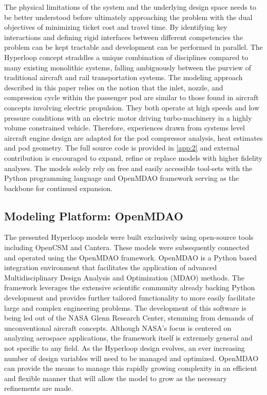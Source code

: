 \documentclass[heading.tex]{subfiles}
\begin{document}
The physical limitations of the system and the underlying design space needs to be better understood before ultimately approaching the
problem with the dual objectives of minimizing ticket cost and travel time. By identifying key interactions and defining rigid interfaces between
different competencies the problem can
be kept tractable and development can be performed in parallel. The Hyperloop concept straddles a unique combination of disciplines
compared to many existing monolithic systems, falling ambiguously between the purview of
traditional aircraft and rail transportation systems. The modeling
approach described in this paper relies on the notion that the inlet, nozzle, and compression cycle within the passenger pod are similar to those
found in aircraft concepts involving electric propulsion. They both operate at high speeds and low pressure conditions with an electric motor
driving turbo-machinery in a highly volume constrained vehicle. Therefore, experiences drawn from systems level aircraft engine
design are adapted for the pod compressor analysis, heat estimates and pod geometry. The full source code is provided in
 \cref{app:2} and external contribution is encouraged to expand, refine or replace models with higher fidelity analyses. The models solely rely on
free and easily accessible tool-sets with the Python programming language and OpenMDAO  framework serving as the backbone for continued expansion.  

\subsection{Modeling Platform: OpenMDAO}


The presented Hyperloop models were built exclusively using open-source tools including OpenCSM
 and
Cantera. These models were subsequently connected and operated using the OpenMDAO framework. OpenMDAO is a Python based
integration environment that facilitates the application of advanced Multidisciplinary Design Analysis and Optimization (MDAO) methods.
The framework leverages the extensive scientific community already backing Python development and provides further tailored functionality
to more easily facilitate large and complex engineering problems. The development of this software is being led out of the NASA Glenn Research
Center, stemming from demands of unconventional aircraft concepts. Although NASA's
focus is centered on analyzing aerospace applications, the framework itself is extremely general and not specific to any field. As the
Hyperloop design evolves, an ever increasing number of design variables will need to be managed and optimized. OpenMDAO can provide
the means to manage this rapidly growing complexity in an efficient and flexible manner that will allow the model to grow as the necessary
refinements are made.
\end{document}
